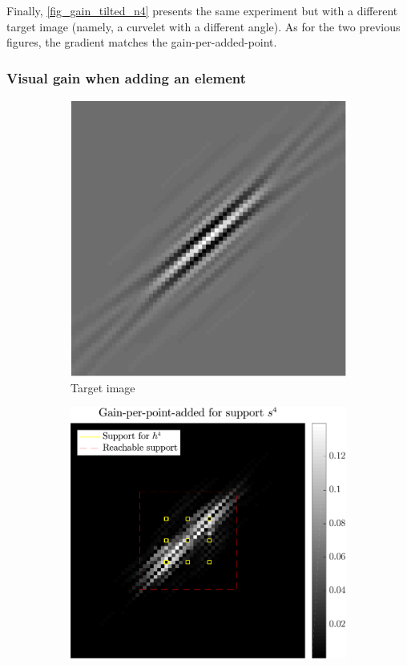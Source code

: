 \noindent
Finally, \cref{fig_gain_tilted_n4} presents the same experiment but with a different target image (namely, a curvelet with a different angle). As for the two previous figures, the gradient matches the gain-per-added-point.


\FloatBarrier
\subsubsection{Visual gain when adding an element}

\begin{figure}[!ht]\centering
\begin{subfigure}[b]{0.28\linewidth}\centering
\includegraphics[width=\linewidth]{figures/before_after/target.pdf}
	\caption{Target image}\label{fig_beforeafter-target}
\end{subfigure}
\begin{subfigure}[b]{0.34\linewidth}\centering
\includegraphics[width=\linewidth]{figures/before_after/before_gain.pdf}

\end{subfigure}
\end{figure}
